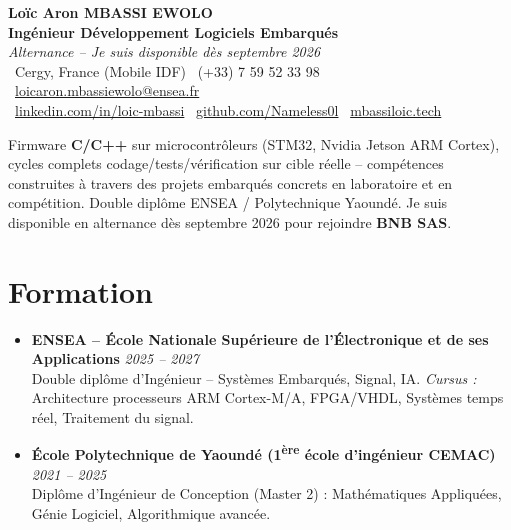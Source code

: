 \documentclass[a4paper,11pt]{article}
\begin{document}
\begin{center}
    {\Large \textbf{Loïc Aron MBASSI EWOLO}} \\ \vspace{4pt}
    \textbf{\large Ingénieur Développement Logiciels Embarqués} \\
    \textit{\small Alternance -- Je suis disponible dès septembre 2026} \\ \vspace{4pt}
    \small
    \faMapMarker\ Cergy, France (Mobile IDF) \quad
    \faPhone\ (+33) 7 59 52 33 98 \quad
    \faEnvelope\ \href{mailto:loicaron.mbassiewolo@ensea.fr}{loicaron.mbassiewolo@ensea.fr} \\ \vspace{2pt}
    \faLinkedin\ \href{https://www.linkedin.com/in/loic-mbassi/}{linkedin.com/in/loic-mbassi} \quad
    \faGithub\ \href{https://github.com/Nameless0l}{github.com/Nameless0l} \quad
    \faGlobe\ \href{https://mbassiloic.tech}{mbassiloic.tech}
\end{center}

\vspace{-6pt}

\noindent\small{Firmware \textbf{C/C++} sur microcontrôleurs (STM32, Nvidia Jetson ARM Cortex), cycles complets codage/tests/vérification sur cible réelle -- compétences construites à travers des projets embarqués concrets en laboratoire et en compétition. Double diplôme ENSEA / Polytechnique Yaoundé. Je suis disponible en alternance dès septembre 2026 pour rejoindre \textbf{BNB SAS}.}

\section{Formation}
\begin{itemize}[leftmargin=*, label=\tiny$\bullet$, nosep]
    \item \textbf{ENSEA -- École Nationale Supérieure de l'Électronique et de ses Applications} \hfill \textit{2025 -- 2027} \\
    \small{Double diplôme d'Ingénieur -- Systèmes Embarqués, Signal, IA. \textit{Cursus :} Architecture processeurs ARM Cortex-M/A, FPGA/VHDL, Systèmes temps réel, Traitement du signal.}
    \item \textbf{École Polytechnique de Yaoundé (1\textsuperscript{ère} école d'ingénieur CEMAC)} \hfill \textit{2021 -- 2025} \\
    \small{Diplôme d'Ingénieur de Conception (Master 2) : Mathématiques Appliquées, Génie Logiciel, Algorithmique avancée.}
\end{itemize}
\end{document}

